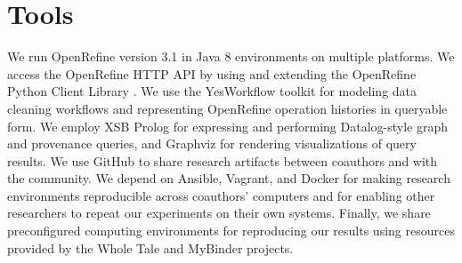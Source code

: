 \section{Tools}

We run OpenRefine version 3.1 \cite{OpenRefine} in Java 8 environments on multiple platforms. We access the OpenRefine HTTP API by using and extending the OpenRefine Python Client Library \cite{makepeace18ORclient}. We use the YesWorkflow toolkit \cite{yw-website} for modeling data cleaning workflows and representing OpenRefine operation histories in queryable form. We employ XSB Prolog \cite{xsb_software} for expressing and performing Datalog-style graph and provenance queries, and Graphviz for rendering visualizations of query results. We use GitHub to share research artifacts between coauthors and with the community. We depend on Ansible, Vagrant, and Docker for making research environments reproducible across coauthors' computers and for enabling other researchers to repeat our experiments on their own systems. Finally, we share preconfigured computing environments for reproducing our results using resources provided by the Whole Tale \cite{brinckman2019computing} and MyBinder \cite{Binder_2018} projects.

